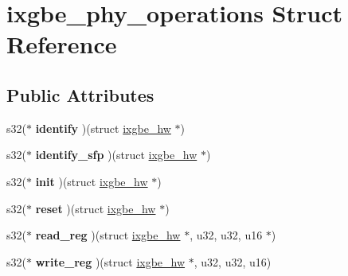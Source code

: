 \hypertarget{structixgbe__phy__operations}{
\section{ixgbe\_\-phy\_\-operations Struct Reference}
\label{structixgbe__phy__operations}
}
\subsection*{Public Attributes}
\begin{DoxyCompactItemize}
\item 
\hypertarget{structixgbe__phy__operations_ac5db61e61d06cd78f218e1f1ff21cbba}{
s32($\ast$ {\bfseries identify} )(struct \hyperlink{structixgbe__hw}{ixgbe\_\-hw} $\ast$)}
\label{structixgbe__phy__operations_ac5db61e61d06cd78f218e1f1ff21cbba}

\item 
\hypertarget{structixgbe__phy__operations_a4b0396cd722ea64a7cb96b721dcc4b3e}{
s32($\ast$ {\bfseries identify\_\-sfp} )(struct \hyperlink{structixgbe__hw}{ixgbe\_\-hw} $\ast$)}
\label{structixgbe__phy__operations_a4b0396cd722ea64a7cb96b721dcc4b3e}

\item 
\hypertarget{structixgbe__phy__operations_a440694dd7acba190966f10ffd7148f48}{
s32($\ast$ {\bfseries init} )(struct \hyperlink{structixgbe__hw}{ixgbe\_\-hw} $\ast$)}
\label{structixgbe__phy__operations_a440694dd7acba190966f10ffd7148f48}

\item 
\hypertarget{structixgbe__phy__operations_ad5921a33f38bb5ac6e5f8e8f230176e0}{
s32($\ast$ {\bfseries reset} )(struct \hyperlink{structixgbe__hw}{ixgbe\_\-hw} $\ast$)}
\label{structixgbe__phy__operations_ad5921a33f38bb5ac6e5f8e8f230176e0}

\item 
\hypertarget{structixgbe__phy__operations_aa70589d299efbc0081d2b3a228ea54dd}{
s32($\ast$ {\bfseries read\_\-reg} )(struct \hyperlink{structixgbe__hw}{ixgbe\_\-hw} $\ast$, u32, u32, u16 $\ast$)}
\label{structixgbe__phy__operations_aa70589d299efbc0081d2b3a228ea54dd}

\item 
\hypertarget{structixgbe__phy__operations_a2765bffc8da627e5fa09aa8f08b5ba19}{
s32($\ast$ {\bfseries write\_\-reg} )(struct \hyperlink{structixgbe__hw}{ixgbe\_\-hw} $\ast$, u32, u32, u16)}
\label{structixgbe__phy__operations_a2765bffc8da627e5fa09aa8f08b5ba19}


\end{DoxyCompactItemize}
